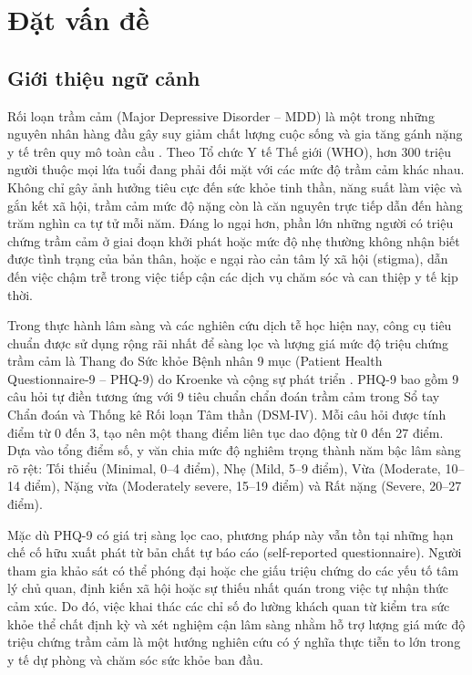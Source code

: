 \chapter{Đặt vấn đề}
\label{ch:dat-van-de}

\section{Giới thiệu ngữ cảnh}
\label{sec:gioi-thieu-ngu-canh}

Rối loạn trầm cảm (Major Depressive Disorder -- MDD) là một trong những nguyên nhân hàng đầu gây suy giảm chất lượng cuộc sống và gia tăng gánh nặng y tế trên quy mô toàn cầu \cite{pratt1991discriminant}. Theo Tổ chức Y tế Thế giới (WHO), hơn 300 triệu người thuộc mọi lứa tuổi đang phải đối mặt với các mức độ trầm cảm khác nhau. Không chỉ gây ảnh hưởng tiêu cực đến sức khỏe tinh thần, năng suất làm việc và gắn kết xã hội, trầm cảm mức độ nặng còn là căn nguyên trực tiếp dẫn đến hàng trăm nghìn ca tự tử mỗi năm. Đáng lo ngại hơn, phần lớn những người có triệu chứng trầm cảm ở giai đoạn khởi phát hoặc mức độ nhẹ thường không nhận biết được tình trạng của bản thân, hoặc e ngại rào cản tâm lý xã hội (stigma), dẫn đến việc chậm trễ trong việc tiếp cận các dịch vụ chăm sóc và can thiệp y tế kịp thời.

Trong thực hành lâm sàng và các nghiên cứu dịch tễ học hiện nay, công cụ tiêu chuẩn được sử dụng rộng rãi nhất để sàng lọc và lượng giá mức độ triệu chứng trầm cảm là Thang đo Sức khỏe Bệnh nhân 9 mục (Patient Health Questionnaire-9 -- PHQ-9) do Kroenke và cộng sự phát triển \cite{kroenke2001phq, spitzer1999validation}. PHQ-9 bao gồm 9 câu hỏi tự điền tương ứng với 9 tiêu chuẩn chẩn đoán trầm cảm trong Sổ tay Chẩn đoán và Thống kê Rối loạn Tâm thần (DSM-IV). Mỗi câu hỏi được tính điểm từ 0 đến 3, tạo nên một thang điểm liên tục dao động từ 0 đến 27 điểm. Dựa vào tổng điểm số, y văn chia mức độ nghiêm trọng thành năm bậc lâm sàng rõ rệt: Tối thiểu (Minimal, 0--4 điểm), Nhẹ (Mild, 5--9 điểm), Vừa (Moderate, 10--14 điểm), Nặng vừa (Moderately severe, 15--19 điểm) và Rất nặng (Severe, 20--27 điểm).

Mặc dù PHQ-9 có giá trị sàng lọc cao, phương pháp này vẫn tồn tại những hạn chế cố hữu xuất phát từ bản chất tự báo cáo (self-reported questionnaire). Người tham gia khảo sát có thể phóng đại hoặc che giấu triệu chứng do các yếu tố tâm lý chủ quan, định kiến xã hội hoặc sự thiếu nhất quán trong việc tự nhận thức cảm xúc. Do đó, việc khai thác các chỉ số đo lường khách quan từ kiểm tra sức khỏe thể chất định kỳ và xét nghiệm cận lâm sàng nhằm hỗ trợ lượng giá mức độ triệu chứng trầm cảm là một hướng nghiên cứu có ý nghĩa thực tiễn to lớn trong y tế dự phòng và chăm sóc sức khỏe ban đầu.

